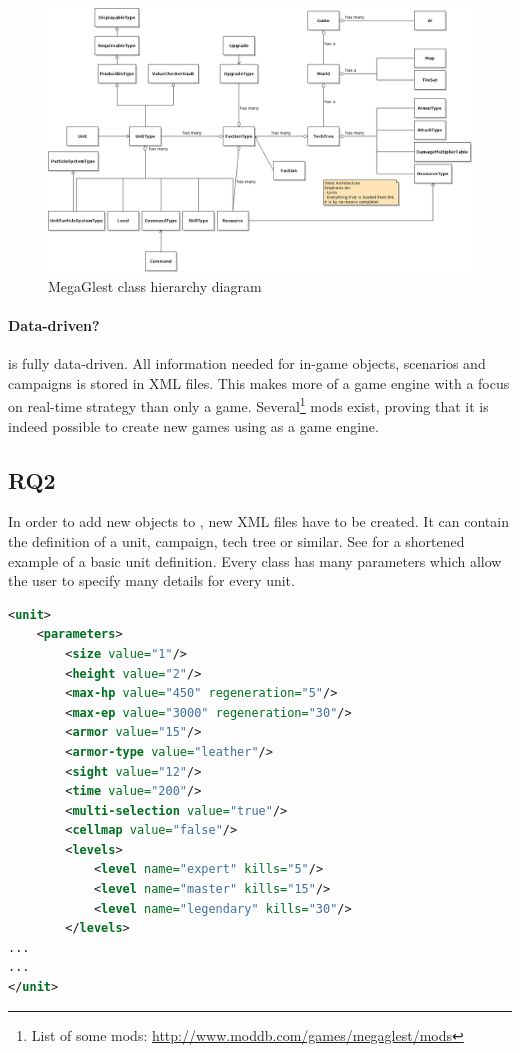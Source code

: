 \begin{figure}[h!]
    \centering
    \includegraphics[angle=90,width=\textwidth]{pics/gamehierarchy}
    \caption{MegaGlest class hierarchy diagram}
    \label{fig:glestclassh}
\end{figure}

\paragraph{Data-driven?}
\GLEST{} is fully data-driven. All information needed for in-game objects, scenarios and campaigns is stored in XML files.
This makes \GLEST{} more of a game engine with a focus on real-time strategy than only a game. Several\footnote{List of
some mods: \url{http://www.moddb.com/games/megaglest/mods}} mods exist, proving that it is indeed possible to create new
games using \GLEST{} as a game engine. 

\subsection{RQ2}
In order to add new objects to \GLEST{}, new XML files have to be created. It can contain the definition of a unit, campaign,
tech tree or similar. See  for a shortened example of a basic unit definition. Every class has many
parameters which allow the user to specify many details for every unit. 

\begin{lstlisting}[language=XML,caption=A basic \GLEST{} (shortened) unit definition in XML, label=glestxml]
<unit>
	<parameters>
		<size value="1"/>
		<height value="2"/>
		<max-hp value="450" regeneration="5"/>
		<max-ep value="3000" regeneration="30"/>
		<armor value="15"/>	
		<armor-type value="leather"/>
		<sight value="12"/>
		<time value="200"/>	
		<multi-selection value="true"/>	
		<cellmap value="false"/>
		<levels>
			<level name="expert" kills="5"/>
			<level name="master" kills="15"/>
			<level name="legendary" kills="30"/>
		</levels>
...
...
</unit>
\end{lstlisting}

